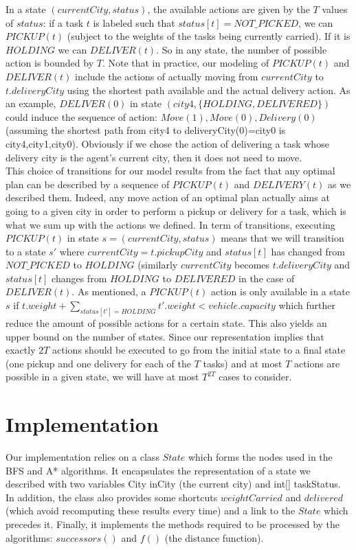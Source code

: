 \documentclass[11pt]{article}
\begin{document}
In a state $(currentCity, status)$, the available actions are given by the $T$ values of $status$: if a task $t$ is labeled such that $status[t]=NOT\_PICKED$, we can $PICKUP(t)$ (subject to the weights of the tasks being currently carried). If it is $HOLDING$ we can $DELIVER(t)$. So in any state, the number of possible action is bounded by $T$. Note that in practice, our modeling of $PICKUP(t)$ and $DELIVER(t)$ include the actions of actually moving from $currentCity$ to $t.deliveryCity$ using the shortest path available and the actual delivery action. As an example, $DELIVER(0)$ in state $(city4,\{HOLDING,DELIVERED\})$ could induce the sequence of action: $Move(1),Move(0),Delivery(0)$ (assuming the shortest path from city4 to deliveryCity(0)=city0 is city4,city1,city0). Obviously if we chose the action of delivering a task whose delivery city is the agent's current city, then it does not need to move. \\
This choice of transitions for our model results from the fact that any optimal plan can be described by a sequence of $PICKUP(t)$ and $DELIVERY(t)$ as we described them. Indeed, any move action of an optimal plan actually aims at going to a given city in order to perform a pickup or delivery for a task, which is what we sum up with the actions we defined. In term of transitions, executing $PICKUP(t)$ in state $s=(currentCity, status)$ means that we will transition to a state $s'$ where $currentCity=t.pickupCity$ and $status[t]$ has changed from $NOT\_PICKED$ to $HOLDING$ (similarly $currentCity$ becomes $t.deliveryCity$ and $status[t]$ changes from $HOLDING$ to $DELIVERED$ in the case of $DELIVER(t)$. As mentioned, a $PICKUP(t)$ action is only available in a state $s$ if $t.weight+\sum_{status[t']=HOLDING}t'.weight<vehicle.capacity$ which further reduce the amount of possible actions for a certain state.
This also yields an upper bound on the number of states. Since our representation implies that exactly $2T$ actions should be executed to go from the initial state to a final state (one pickup and one delivery for each of the $T$ tasks) and at most $T$ actions are possible in a given state, we will have at most $T^{2T}$ cases to consider.  


\section{Implementation}

Our implementation relies on a class $State$ which forms the nodes used in the BFS and A* algorithms. It encapsulates the representation of a state we described with two variables City inCity (the current city) and int[] taskStatus. In addition, the class also provides some shortcuts $weightCarried$ and $delivered$ (which avoid recomputing these results every time) and a link to the $State$ which precedes it.
Finally, it implements the methods required to be processed by the algorithms: $successors()$ and $f()$ (the distance function).
\end{document}
